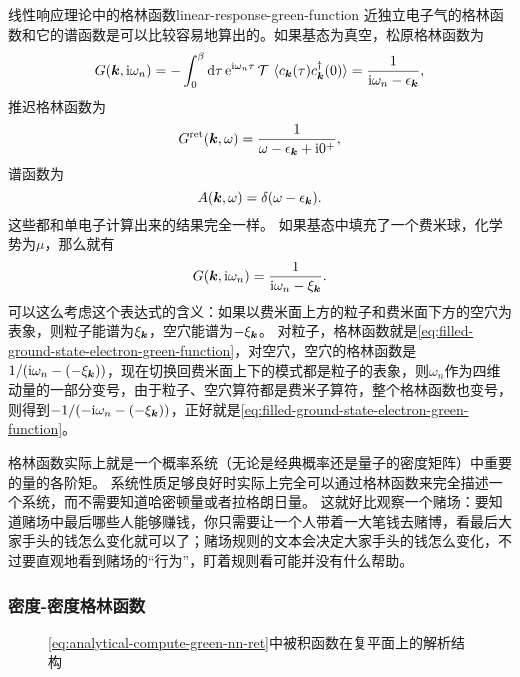 \begin{back}{线性响应理论中的格林函数}{linear-response-green-function}
    近独立电子气的格林函数和它的谱函数是可以比较容易地算出的。如果基态为真空，松原格林函数为
    \begin{equation}
        G(\vb*{k}, \mathrm{i} \omega_n) = - \int_0^\beta \dd{\tau} \mathrm{e}^{\mathrm{i} \omega_n \tau} \operatorname{\mathcal{T}} \expval*{c_{\vb*{k}}(\tau) c_{\vb*{k}}^\dagger(0)} = \frac{1}{\mathrm{i} \omega_n - \epsilon_{\vb*{k}}},
    \end{equation}
    推迟格林函数为
    \begin{equation}
        G^\text{ret}(\vb*{k}, \omega) = \frac{1}{\omega - \epsilon_{\vb*{k}} + \mathrm{i} 0^+},
    \end{equation}
    谱函数为
    \begin{equation}
        A(\vb*{k}, \omega) = \delta(\omega - \epsilon_{\vb*{k}}).
    \end{equation}
    这些都和单电子计算出来的结果完全一样。
    如果基态中填充了一个费米球，化学势为$\mu$，那么就有
    \begin{equation}
        G(\vb*{k}, \mathrm{i} \omega_n) = \frac{1}{\mathrm{i} \omega_n - \xi_{\vb*{k}}}.
        \label{eq:filled-ground-state-electron-green-function}
    \end{equation}
    可以这么考虑这个表达式的含义：如果以费米面上方的粒子和费米面下方的空穴为表象，则粒子能谱为$\xi_{\vb*{k}}$，空穴能谱为$- \xi_{\vb*{k}}$。
    对粒子，格林函数就是\eqref{eq:filled-ground-state-electron-green-function}，对空穴，空穴的格林函数是$1 / (\mathrm{i} \omega_n - (- \xi_{\vb*{k}}))$，现在切换回费米面上下的模式都是粒子的表象，则$\omega_n$作为四维动量的一部分变号，由于粒子、空穴算符都是费米子算符，整个格林函数也变号，则得到$- 1 / (- \mathrm{i} \omega_n - (- \xi_{\vb*{k}}))$，正好就是\eqref{eq:filled-ground-state-electron-green-function}。

    格林函数实际上就是一个概率系统（无论是经典概率还是量子的密度矩阵）中重要的量的各阶矩。
    系统性质足够良好时实际上完全可以通过格林函数来完全描述一个系统，而不需要知道哈密顿量或者拉格朗日量。
    这就好比观察一个赌场：要知道赌场中最后哪些人能够赚钱，你只需要让一个人带着一大笔钱去赌博，看最后大家手头的钱怎么变化就可以了；赌场规则的文本会决定大家手头的钱怎么变化，不过要直观地看到赌场的“行为”，盯着规则看可能并没有什么帮助。
\end{back}

\subsubsection{密度-密度格林函数}\label{sec:density-density-green-function}

\begin{figure}
    \centering
    
    \caption{\eqref{eq:analytical-compute-green-nn-ret}中被积函数在复平面上的解析结构}
    \label{fig:rpa-pole}
\end{figure}

